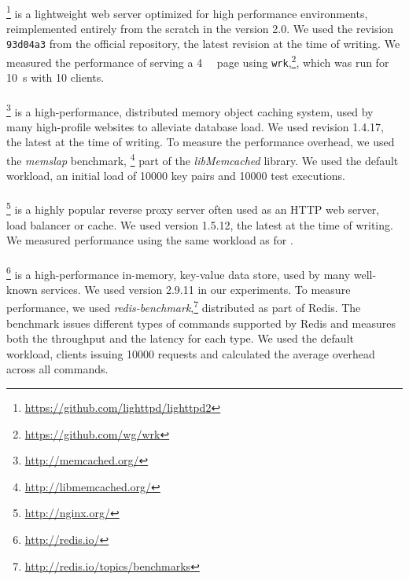 \paragraph{\lighttpdtwo}\footnote{\url{https://github.com/lighttpd/lighttpd2}}
is a lightweight web server optimized for high performance environments,
reimplemented entirely from the scratch in the version 2.0.  We used the
revision \lstinline`93d04a3` from the official \git repository, the
latest revision at the time of writing. We measured the performance of serving
a \SI{4}{\kilo\byte} page using
\lstinline`wrk`,\footnote{\url{https://github.com/wg/wrk}}, which was run for
\SI{10}{\second} with \num{10} clients.

\paragraph{\memcached}\footnote{\url{http://memcached.org/}} 
is a high-performance, distributed memory object caching system, used by
many high-profile websites to alleviate database load. We used 
revision 1.4.17, the latest at the time of writing. To measure the performance
overhead, we used the \emph{memslap} benchmark, \footnote{\url{http://libmemcached.org/}}
part of the \emph{libMemcached} library. We used the default workload,
\ie an initial load of \num{10000} key pairs and \num{10000} test executions.


\paragraph{\nginx}\footnote{\url{http://nginx.org/}}
is a highly popular reverse proxy server often used as an HTTP web
server, load balancer or cache. We used version 1.5.12, the
latest at the time of writing.  We measured
performance using the same workload as for \lighttpdtwo.


\paragraph{\redis}\footnote{\url{http://redis.io/}}
is a high-performance in-memory, key-value data store, used by many
well-known services. %
We used version 2.9.11 in our experiments.  To measure
performance, we used
\emph{redis-benchmark},\footnote{\url{http://redis.io/topics/benchmarks}}
distributed as part of Redis. The benchmark issues different types
of commands supported by Redis and measures both the throughput and
the latency for each type. We used the default workload, 
clients issuing \num{10000} requests and calculated the average overhead
across all commands.

